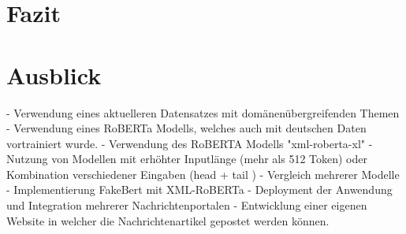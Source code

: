 \chapter{Fazit}
\label{chap:fazit}


\chapter{Ausblick}
\label{chap:ausblick}

- Verwendung eines aktuelleren Datensatzes mit domänenübergreifenden Themen
- Verwendung eines RoBERTa Modells, welches auch mit deutschen Daten vortrainiert wurde.
- Verwendung des RoBERTA Modells "xml-roberta-xl"
- Nutzung von Modellen mit erhöhter Inputlänge (mehr als 512 Token) oder Kombination verschiedener Eingaben (head + tail \cite{sun2020finetuneberttextclassification})
- Vergleich mehrerer Modelle
- Implementierung FakeBert mit XML-RoBERTa
- Deployment der Anwendung und Integration mehrerer Nachrichtenportalen
- Entwicklung einer eigenen Website in welcher die Nachrichtenartikel gepostet werden können.
